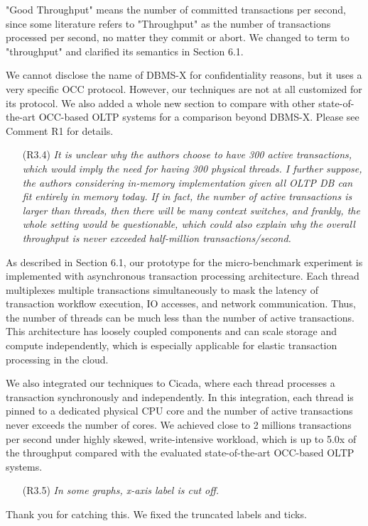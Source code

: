 \documentclass{article}
\newcommand{\changed}[1]{#1}
\newcommand{\changed}[1]{{\color{blue}#1}}
\begin{document}
\changed{
	"Good Throughput" means the number of committed transactions per second, since some literature refers to "Throughput" as the number of transactions processed per second, no matter they commit or abort. We changed to term to "throughput" and clarified its semantics in Section 6.1.
	
	
	We cannot disclose the name of DBMS-X for confidentiality reasons, but it uses a very specific OCC protocol. However, our techniques are not at all customized for its protocol. 	We also added a whole new section to compare with other state-of-the-art OCC-based OLTP systems for a comparison beyond DBMS-X. Please see Comment R1 for details.
	
}


\begin{itemize}
\item[(R3.4)] \emph{It is unclear why the authors choose to have 300 active transactions,
	which would imply the need for having 300 physical threads. I further
	suppose, the authors considering in-memory implementation given all OLTP
	DB can fit entirely in memory today. If in fact, the number of active
	transactions is larger than threads, then there will be many context switches,
	and frankly, the whole setting would be questionable, which could also
	explain why the overall throughput is never exceeded half-million
	transactions/second.}
\end{itemize}

\changed{
	As described in Section 6.1, our prototype for the micro-benchmark experiment is implemented with asynchronous transaction processing architecture. Each thread multiplexes multiple transactions simultaneously to mask the latency of transaction workflow execution, IO accesses, and network communication. Thus, the number of threads can be much less than the number of active transactions. This architecture has loosely coupled components and can scale storage and compute independently, which is especially applicable for elastic transaction processing in the cloud.

	We also integrated our techniques to Cicada, where each thread processes a transaction synchronously and independently. In this integration, each thread is pinned to a dedicated physical CPU core and the number of active transactions never exceeds the number of cores. We achieved close to 2 millions transactions per second under highly skewed, write-intensive workload, which is up to 5.0x of the throughput compared with the evaluated state-of-the-art OCC-based OLTP systems.  
}

\begin{itemize}
\item[(R3.5)] \emph{In some graphs, x-axis label is cut off.}
\end{itemize}

\changed{
	Thank you for catching this. We fixed the truncated labels and ticks.
}
\end{document}

